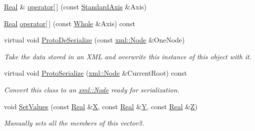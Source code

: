 \begin{DoxyCompactItemize}
\item 
\hyperlink{namespaceMezzanine_a726731b1a7df72bf3583e4a97282c6f6}{Real} \& \hyperlink{classMezzanine_1_1Vector3_ab59ac84db02361f14436e0151b41057f}{operator\mbox{[}$\,$\mbox{]}} (const \hyperlink{namespaceMezzanine_ab41a00a8c6a47b576dc987ec34e16ba1}{StandardAxis} \&Axis)
\item 
\hyperlink{namespaceMezzanine_a726731b1a7df72bf3583e4a97282c6f6}{Real} \hyperlink{classMezzanine_1_1Vector3_a5adc4411592395946950c6ec937a17e1}{operator\mbox{[}$\,$\mbox{]}} (const \hyperlink{namespaceMezzanine_adcbb6ce6d1eb4379d109e51171e2e493}{Whole} \&Axis) const 
\item 
virtual void \hyperlink{classMezzanine_1_1Vector3_a75ed62196ecc449c6a4e6ea8242c4b14}{ProtoDeSerialize} (const \hyperlink{classMezzanine_1_1xml_1_1Node}{xml::Node} \&OneNode)
\begin{DoxyCompactList}\small\item\em Take the data stored in an XML and overwrite this instance of this object with it. \item\end{DoxyCompactList}\item 
virtual void \hyperlink{classMezzanine_1_1Vector3_a26315562a108268e0ed3ef1bf707100d}{ProtoSerialize} (\hyperlink{classMezzanine_1_1xml_1_1Node}{xml::Node} \&CurrentRoot) const 
\begin{DoxyCompactList}\small\item\em Convert this class to an \hyperlink{classMezzanine_1_1xml_1_1Node}{xml::Node} ready for serialization. \item\end{DoxyCompactList}\item 
void \hyperlink{classMezzanine_1_1Vector3_aa4c27471fdb61bffe9bcbbc8ebee4789}{SetValues} (const \hyperlink{namespaceMezzanine_a726731b1a7df72bf3583e4a97282c6f6}{Real} \&\hyperlink{classMezzanine_1_1Vector3_aa858d9bc5ac5ad1b685b7088c94c05f6}{X}, const \hyperlink{namespaceMezzanine_a726731b1a7df72bf3583e4a97282c6f6}{Real} \&\hyperlink{classMezzanine_1_1Vector3_a2303527e4ea4cd1659a23320627cd62c}{Y}, const \hyperlink{namespaceMezzanine_a726731b1a7df72bf3583e4a97282c6f6}{Real} \&\hyperlink{classMezzanine_1_1Vector3_a9b887faced986921956f20f3e4cb8ddc}{Z})
\begin{DoxyCompactList}\small\item\em Manually sets all the members of this vector3. \item\end{DoxyCompactList}\item 

\end{DoxyCompactItemize}
